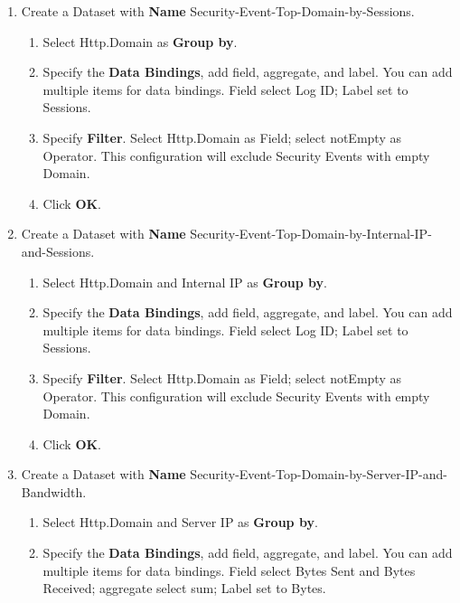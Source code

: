 \begin{description}
\begin{enumerate}
\begin{enumerate}
\begin{enumerate}
                \item	Field select Log ID; Label set to Sessions.
            \end{enumerate}
            \item	Click \textbf{OK}.
        \end{enumerate}
        \item Create a Dataset with \textbf{Name} Security-Event-Top-Domain-by-Sessions.
        \begin{enumerate}
            \item	Select Http.Domain as \textbf{Group by}. 
            \item	Specify the \textbf{Data Bindings}, add field, aggregate, and label. You can add multiple items for data bindings. Field select Log ID; Label set to Sessions.
            \item	Specify \textbf{Filter}. Select Http.Domain as Field; select notEmpty as Operator. This configuration will exclude Security Events with empty Domain.
            \item	Click \textbf{OK}.
        \end{enumerate}
        \item Create a Dataset with \textbf{Name} Security-Event-Top-Domain-by-Internal-IP-and-Sessions.
        \begin{enumerate}
            \item	Select Http.Domain and Internal IP as \textbf{Group by}. 
            \item	Specify the \textbf{Data Bindings}, add field, aggregate, and label. You can add multiple items for data bindings. Field select Log ID; Label set to Sessions.
            \item	Specify \textbf{Filter}. Select Http.Domain as Field; select notEmpty as Operator. This configuration will exclude Security Events with empty Domain.
            \item	Click \textbf{OK}.
        \end{enumerate}
        \item Create a Dataset with \textbf{Name} Security-Event-Top-Domain-by-Server-IP-and-Bandwidth.
        \begin{enumerate}
            \item	Select Http.Domain and Server IP as \textbf{Group by}. 
            \item	Specify the \textbf{Data Bindings}, add field, aggregate, and label. You can add multiple items for data bindings. Field select Bytes Sent and Bytes Received; aggregate select sum; Label set to Bytes.

\end{enumerate}
\end{enumerate}
\end{description}
